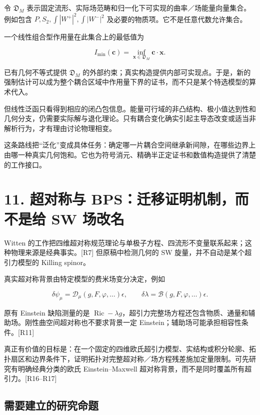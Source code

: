 \documentclass[UTF8,a4paper,11pt,fontset=fandol]{ctexart}
\begin{document}
令 \(\mathfrak D_M\)
表示固定流形、实际场范畴和归一化下可实现的曲率／场能量向量集合。例如包含
\(P,S_2,\int|W^+|^2,\int|W^-|^2\)
及必要的物质项。它不是任意代数允许集合。

一个线性组合型作用量在此集合上的最低值为

\[
I_{\min}(\mathbf c)=\inf_{\mathbf x\in\mathfrak D_M}
\mathbf c\cdot\mathbf x.
\tag{P19}
\]

已有几何不等式提供 \(\mathfrak D_M\)
的外部约束；真实构造提供内部可实现点。于是，新的强制估计可以成为整个耦合区域中作用量下界的证书，而不只是某个特选模型的算术代入。

但线性泛函只看得到相应的闭凸包信息。能量可行域的非凸结构、极小值达到性和几何分支，仍需要实际解与退化理论。只有耦合变化确实引起主导态改变或适当非解析行为，才有理由讨论物理相变。

这条路线把``泛化''变成具体任务：确定哪一片耦合空间继承新间隙，在哪些边界上由哪一种真实几何饱和。它也为符号消元、精确半正定证书和数值构造提供了清楚的工作接口。

\section{11. 超对称与 BPS：迁移证明机制，而不是给 SW
场改名}\label{ux8d85ux5bf9ux79f0ux4e0e-bpsux8fc1ux79fbux8bc1ux660eux673aux5236ux800cux4e0dux662fux7ed9-sw-ux573aux6539ux540d}

Witten
的工作把四维超对称规范理论与单极子方程、四流形不变量联系起来；这种物理来源是经典事实。{[}R7{]}
但原稿中检测几何的 SW 旋量，并不自动是某个超引力模型的 Killing spinor。

真实超对称背景由特定模型的费米场变分决定，例如

\[
\delta\psi_\mu=\mathcal D_\mu(g,F,\varphi,\ldots)\epsilon,
\qquad
\delta\lambda=\mathcal B(g,F,\varphi,\ldots)\epsilon.
\tag{P20}
\]

原有 Einstein 缺陷测量的是
\(\operatorname{Ric}-\lambda g\)，超引力完整场方程还包含物质、通量和辅助场。刚性曲空间超对称也不要求背景一定
Einstein；辅助场可能承担相容性条件。{[}R11{]}

真正有价值的目标是：在一个固定的四维欧氏超引力模型、实结构或积分轮廓、拓扑扇区和边界条件下，证明拓扑对完整超对称／场方程残差施加定量限制。可先研究有明确经典分类的欧氏
Einstein--Maxwell 超对称背景，而不是同时覆盖所有超引力。{[}R16--R17{]}

\subsection{需要建立的研究命题}\label{ux9700ux8981ux5efaux7acbux7684ux7814ux7a76ux547dux9898}
\end{document}
